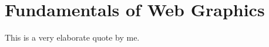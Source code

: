 %
%
% 
% 

\chapter{Fundamentals of Web Graphics}

\label{chap:Fundamentals}

\begin{displayquote}
  This is a very elaborate quote by me.
\end{displayquote}
